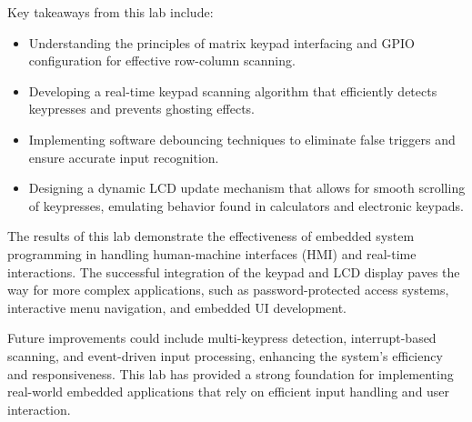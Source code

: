 \documentclass[12pt]{article}
\begin{document}
Key takeaways from this lab include:
\begin{itemize}
    \item Understanding the principles of matrix keypad interfacing and GPIO configuration for effective row-column scanning.
    \item Developing a real-time keypad scanning algorithm that efficiently detects keypresses and prevents ghosting effects.
    \item Implementing software debouncing techniques to eliminate false triggers and ensure accurate input recognition.
    \item Designing a dynamic LCD update mechanism that allows for smooth scrolling of keypresses, emulating behavior found in calculators and electronic keypads.
\end{itemize}

The results of this lab demonstrate the effectiveness of embedded system programming in handling human-machine interfaces (HMI) and real-time interactions. The successful integration of the keypad and LCD display paves the way for more complex applications, such as password-protected access systems, interactive menu navigation, and embedded UI development.

Future improvements could include multi-keypress detection, interrupt-based scanning, and event-driven input processing, enhancing the system’s efficiency and responsiveness. This lab has provided a strong foundation for implementing real-world embedded applications that rely on efficient input handling and user interaction.
\end{document}
